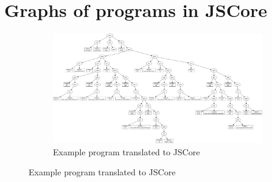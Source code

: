 \section{Graphs of programs in JSCore}
\label{graphs}

\begin{figure}
\begin{figure}[H]
\includegraphics[width=\textwidth]{../interpreter/tests/helloworld/helloworld.png}
\caption{Example program translated to JSCore}
\label{helloworldgraph}
\end{figure}
\end{figure}

